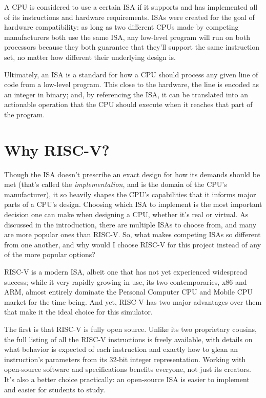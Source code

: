 \documentclass[12pt,twoside]{reedthesis}
\begin{document}
A CPU is considered to use a certain ISA if it supports and has implemented all of its instructions and hardware requirements. ISAs were created for the goal of hardware compatibility: as long as two different CPUs made by competing manufacturers both use the same ISA, any low-level program will run on both processors because they both guarantee that they'll support the same instruction set, no matter how different their underlying design is.


Ultimately, an ISA is a standard for how a CPU should process any given line of code from a low-level program. This close to the hardware, the line is encoded as an integer in binary; and, by referencing the ISA, it can be translated into an actionable operation that the CPU should execute when it reaches that part of the program.

\section{Why RISC-V?}
Though the ISA doesn't prescribe an exact design for how its demands should be met (that's called the \textit{implementation}, and is the domain of the CPU's manufacturer), it so heavily shapes the CPU's capabilities that it informs major parts of a CPU's design. Choosing which ISA to implement is the most important decision one can make when designing a CPU, whether it's real or virtual. As discussed in the introduction, there are multiple ISAs to choose from, and many are more popular ones than RISC-V. So, what makes competing ISAs so different from one another, and why would I choose RISC-V for this project instead of any of the more popular options?


RISC-V is a modern ISA, albeit one that has not yet experienced widespread success; while it very rapidly growing in use, its two contemporaries, x86 and ARM, almost entirely dominate the Personal Computer CPU and Mobile CPU market for the time being. And yet, RISC-V has two major advantages over them that make it the ideal choice for this simulator.

The first is that RISC-V is fully open source. Unlike its two proprietary cousins, the full listing of all the RISC-V instructions is freely available, with details on what behavior is expected of each instruction and exactly how to glean an instruction's parameters from its 32-bit integer representation.
Working with open-source software and specifications benefits everyone, not just its creators. It's also a better choice practically: an open-source ISA is easier to implement and easier for students to study.
\end{document}
